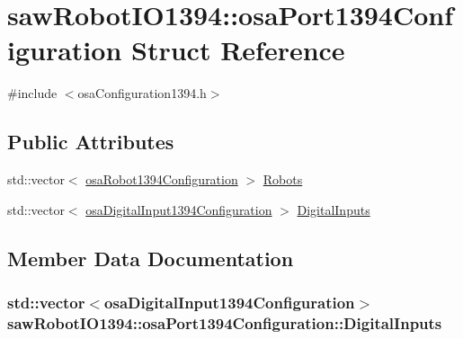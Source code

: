 \hypertarget{structsaw_robot_i_o1394_1_1osa_port1394_configuration}{}\section{saw\+Robot\+I\+O1394\+:\+:osa\+Port1394\+Configuration Struct Reference}
\label{structsaw_robot_i_o1394_1_1osa_port1394_configuration}


{\ttfamily \#include $<$osa\+Configuration1394.\+h$>$}

\subsection*{Public Attributes}
\begin{DoxyCompactItemize}
\item 
std\+::vector$<$ \hyperlink{structsaw_robot_i_o1394_1_1osa_robot1394_configuration}{osa\+Robot1394\+Configuration} $>$ \hyperlink{structsaw_robot_i_o1394_1_1osa_port1394_configuration_ad6f5d420583316ff00715bf069fa8f99}{Robots}
\item 
std\+::vector$<$ \hyperlink{structsaw_robot_i_o1394_1_1osa_digital_input1394_configuration}{osa\+Digital\+Input1394\+Configuration} $>$ \hyperlink{structsaw_robot_i_o1394_1_1osa_port1394_configuration_aa3c3d154b6b2543457126359f09d1411}{Digital\+Inputs}
\end{DoxyCompactItemize}


\subsection{Member Data Documentation}
\hypertarget{structsaw_robot_i_o1394_1_1osa_port1394_configuration_aa3c3d154b6b2543457126359f09d1411}{}
\subsubsection[{Digital\+Inputs}]{\setlength{\rightskip}{0pt plus 5cm}std\+::vector$<${\bf osa\+Digital\+Input1394\+Configuration}$>$ saw\+Robot\+I\+O1394\+::osa\+Port1394\+Configuration\+::\+Digital\+Inputs}\label{structsaw_robot_i_o1394_1_1osa_port1394_configuration_aa3c3d154b6b2543457126359f09d1411}
\hypertarget{structsaw_robot_i_o1394_1_1osa_port1394_configuration_ad6f5d420583316ff00715bf069fa8f99}{}

